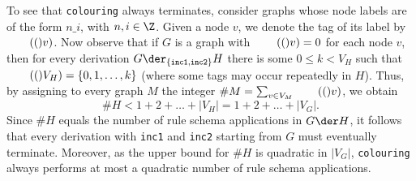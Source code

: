 \begin{example}[Colouring]
To see that \texttt{colouring} always terminates, consider graphs  whose node labels are of the form $n\_i$, with $n,i \in \Z$. Given a node $v$, we  denote the tag of its label by $\tag(v)$. Now observe that if $G$ is a graph with $\tag(v) =0 $ for each node $v$, then for every derivation $G \der_{\{\mathtt{inc1},\mathtt{inc2}\}} H$\/ there is some $0 \leq k < V_H$ such that $\tag(V_H) = \{0,1,\dots,k\}$ (where some tags may occur repeatedly in $H$). Thus, by assigning to every graph $M$\/ the integer $\#M = \sum_{v \in V_M} \tag(v)$, we obtain
 \[ \#H < 1+2+ \dots + |V_H| = 1+2+ \dots + |V_G|. \]  
Since $\#H$ equals the number of rule schema applications in $G \der H$, it follows that every derivation with \texttt{inc1} and \texttt{inc2} starting from $G$ must eventually terminate. Moreover, as the upper bound for $\#H$ is quadratic in $|V_G|$, \texttt{colouring} always performs at most a quadratic number of rule schema applications.
\end{example}

